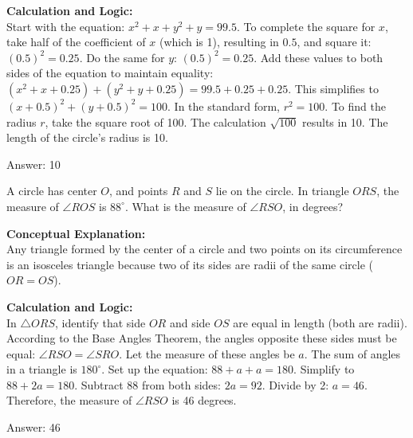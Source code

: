 \documentclass[11pt,paper=a4,answers]{exam}
\begin{document}
\begin{questions}
\begin{solution}
\vspace{30pt}

\textbf{Calculation and Logic:} \\
Start with the equation: $x^2 + x + y^2 + y = 99.5$. To complete the square for $x$, take half of the coefficient of $x$ (which is 1), resulting in $0.5$, and square it: $(0.5)^2 = 0.25$. Do the same for $y$: $(0.5)^2 = 0.25$. Add these values to both sides of the equation to maintain equality: $(x^2 + x + 0.25) + (y^2 + y + 0.25) = 99.5 + 0.25 + 0.25$. This simplifies to $(x + 0.5)^2 + (y + 0.5)^2 = 100$. In the standard form, $r^2 = 100$. To find the radius $r$, take the square root of 100. The calculation $\sqrt{100}$ results in 10. The length of the circle's radius is 10.

\vspace{30pt}

Answer: \colorbox{yellow!100}{10}
\end{solution}

\vspace{60pt}

\question
A circle has center $O$, and points $R$ and $S$ lie on the circle. In triangle $ORS$, the measure of $\angle ROS$ is $88^\circ$. What is the measure of $\angle RSO$, in degrees?

\begin{solution}
\textbf{Conceptual Explanation:} \\
Any triangle formed by the center of a circle and two points on its circumference is an isosceles triangle because two of its sides are radii of the same circle ($OR = OS$).

\vspace{30pt}

\textbf{Calculation and Logic:} \\
In $\triangle ORS$, identify that side $OR$ and side $OS$ are equal in length (both are radii). According to the Base Angles Theorem, the angles opposite these sides must be equal: $\angle RSO = \angle SRO$. Let the measure of these angles be $a$. The sum of angles in a triangle is $180^\circ$. Set up the equation: $88 + a + a = 180$. Simplify to $88 + 2a = 180$. Subtract 88 from both sides: $2a = 92$. Divide by 2: $a = 46$. Therefore, the measure of $\angle RSO$ is 46 degrees.

\vspace{30pt}

Answer: \colorbox{yellow!100}{46}
\end{solution}


\end{questions}
\end{document}
